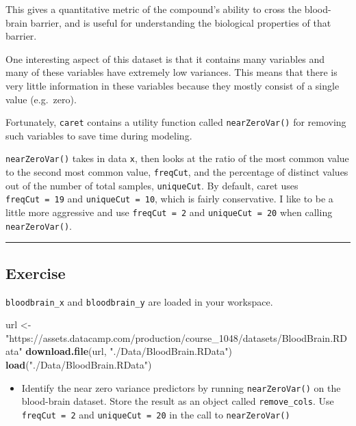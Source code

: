 \documentclass[
]{book}
\newenvironment{Shaded}{\begin{snugshade}}{\end{snugshade}}
\newcommand{\KeywordTok}[1]{\textcolor[rgb]{0.13,0.29,0.53}{\textbf{#1}}}
\newcommand{\NormalTok}[1]{#1}
\newcommand{\StringTok}[1]{\textcolor[rgb]{0.31,0.60,0.02}{#1}}
\providecommand{\tightlist}{%
  \setlength{\itemsep}{0pt}\setlength{\parskip}{0pt}}
\begin{document}
This gives a quantitative metric of the compound's ability to cross the blood-brain barrier, and is useful for understanding the biological properties of that barrier.

One interesting aspect of this dataset is that it contains many variables and many of these variables have extremely low variances. This means that there is very little information in these variables because they mostly consist of a single value (e.g.~zero).

Fortunately, \texttt{caret} contains a utility function called \texttt{nearZeroVar()} for removing such variables to save time during modeling.

\texttt{nearZeroVar()} takes in data \texttt{x}, then looks at the ratio of the most common value to the second most common value, \texttt{freqCut}, and the percentage of distinct values out of the number of total samples, \texttt{uniqueCut}. By default, caret uses \texttt{freqCut\ =\ 19} and \texttt{uniqueCut\ =\ 10}, which is fairly conservative. I like to be a little more aggressive and use \texttt{freqCut\ =\ 2} and \texttt{uniqueCut\ =\ 20} when calling \texttt{nearZeroVar()}.

\begin{center}\rule{0.5\linewidth}{0.5pt}\end{center}

\hypertarget{exercise-26}{%
\subsection*{Exercise}\label{exercise-26}}

\texttt{bloodbrain\_x} and \texttt{bloodbrain\_y} are loaded in your workspace.

\begin{Shaded}
\begin{Highlighting}[]
\NormalTok{url <-}\StringTok{ "https://assets.datacamp.com/production/course_1048/datasets/BloodBrain.RData"}
\KeywordTok{download.file}\NormalTok{(url, }\StringTok{"./Data/BloodBrain.RData"}\NormalTok{)}
\KeywordTok{load}\NormalTok{(}\StringTok{"./Data/BloodBrain.RData"}\NormalTok{)}
\end{Highlighting}
\end{Shaded}

\begin{itemize}
\tightlist
\item
  Identify the near zero variance predictors by running \texttt{nearZeroVar()} on the blood-brain dataset. Store the result as an object called \texttt{remove\_cols}. Use \texttt{freqCut\ =\ 2} and \texttt{uniqueCut\ =\ 20} in the call to \texttt{nearZeroVar()}
\end{itemize}
\end{document}
